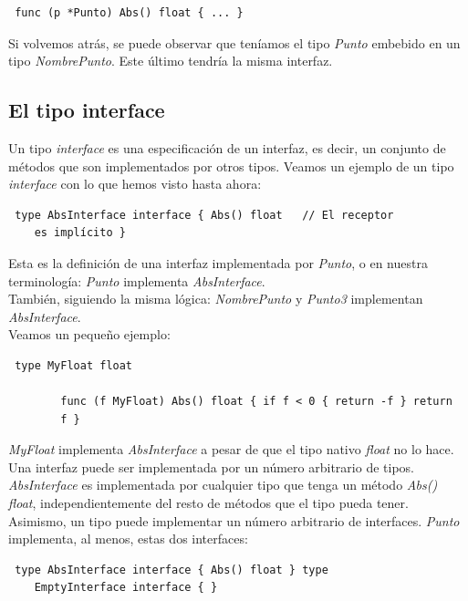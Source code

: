 	\begin{verbatim} func (p *Punto) Abs() float { ... } \end{verbatim}
	
	Si volvemos atrás, se puede observar que teníamos el tipo \textit{Punto}
	embebido en un tipo \textit{NombrePunto}. Este último tendría la misma
	interfaz.
	
	\subsection{El tipo interface}
	
	Un tipo \textit{interface} es una especificación de un interfaz, es decir,
	un conjunto de métodos que son implementados por otros tipos. Veamos un
	ejemplo de un tipo \textit{interface} con lo que hemos visto hasta ahora:
	
	\begin{verbatim} type AbsInterface interface { Abs() float   // El receptor
	es implícito } \end{verbatim}
	
	Esta es la definición de una interfaz implementada por \textit{Punto}, o en
	nuestra terminología: \textit{Punto} implementa \textit{AbsInterface}.\\
	
	También, siguiendo la misma lógica: \textit{NombrePunto} y \textit{Punto3}
	implementan \textit{AbsInterface}.\\
	
	Veamos un pequeño ejemplo:
	
	\begin{verbatim} type MyFloat float
	
		func (f MyFloat) Abs() float { if f < 0 { return -f } return
		f } \end{verbatim}
	
	\textit{MyFloat} implementa \textit{AbsInterface} a pesar de que el tipo
	nativo \textit{float} no lo hace.\\
	
	Una interfaz puede ser implementada por un número arbitrario de tipos.
	\textit{AbsInterface} es implementada por cualquier tipo que tenga un método
	\textit{Abs() float}, independientemente del resto de métodos que el tipo
	pueda tener.\\
	
	Asimismo, un tipo puede implementar un número arbitrario de interfaces.
	\textit{Punto} implementa, al menos, estas dos interfaces:
	
	\begin{verbatim} type AbsInterface interface { Abs() float } type
	EmptyInterface interface { } \end{verbatim}
	

